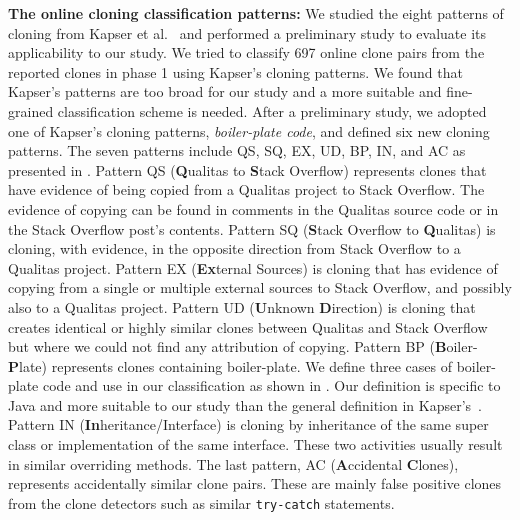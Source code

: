 \documentclass[10pt,journal,compsoc]{IEEEtran}
\begin{document}
\textbf{The online cloning classification patterns:} 
We studied the eight patterns of cloning from Kapser et
al.~\cite{Kapser2006,Kapser2008} and performed a preliminary study to
evaluate its applicability to our study. 
We tried to classify 697 online clone pairs from
the reported clones in phase 1 
using Kapser's cloning patterns. We found that 
Kapser's patterns are too broad for our study and a more suitable and
fine-grained classification scheme is needed. After a preliminary study, we
adopted one of Kapser's cloning patterns, \emph{boiler-plate code}, and defined
six new cloning patterns. The seven patterns include QS, SQ, EX, UD, BP, IN, and
AC as presented in . Pattern QS
(\textbf{Q}ualitas to \textbf{S}tack Overflow) represents clones that have
evidence of being copied from a Qualitas project to Stack Overflow. The evidence
of copying can be found in comments in the Qualitas source code or in the Stack
Overflow post's contents. Pattern SQ (\textbf{S}tack Overflow to
\textbf{Q}ualitas) is cloning, with evidence, in the opposite direction from
Stack Overflow to a Qualitas project. Pattern EX (\textbf{Ex}ternal Sources) is
cloning that has evidence of copying from a single or multiple external sources
to Stack Overflow, and possibly also to a Qualitas project.  Pattern UD
(\textbf{U}nknown \textbf{D}irection) is cloning that creates identical or
highly similar clones between Qualitas and Stack Overflow but where we could not
find any attribution of copying. Pattern BP (\textbf{B}oiler-\textbf{P}late)
represents clones containing boiler-plate. We define three cases of boiler-plate
code and use in our classification as shown in . Our
definition is specific to Java and more suitable to our study than the general
definition in Kapser's~\cite{Kapser2008}.
 Pattern
IN (\textbf{In}heritance/Interface) is cloning by inheritance of the
same super class or implementation of the same interface. These two
activities usually result in similar overriding methods. The last
pattern, AC (\textbf{A}ccidental \textbf{C}lones), represents
accidentally similar clone pairs. These are mainly false positive
clones from the clone detectors such as similar
{\small\texttt{try-catch}} statements.
\end{document}
